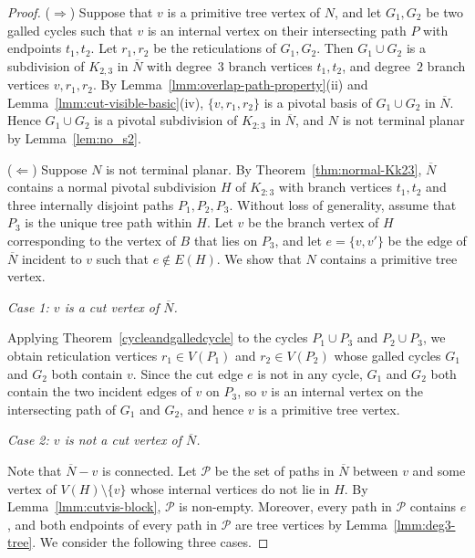 \documentclass[10pt,a4paper]{amsart}
\theoremstyle{plain}
\theoremstyle{thmstyleone}
\theoremstyle{thmstyletwo}
\theoremstyle{thmstylethree}
\begin{document}
\begin{proof}
($\Rightarrow$) Suppose that $v$ is a primitive tree vertex of ${N}$, and let $G_1, G_2$ be two galled cycles such that $v$ is an internal vertex on their intersecting path $P$ with endpoints $t_1, t_2$. Let $r_1, r_2$ be the reticulations of $G_1, G_2$. Then $G_1 \cup G_2$ is a subdivision of $K_{2,3}$ in $\overline{N}$ with degree~$3$ branch vertices $t_1, t_2$, and degree~$2$ branch vertices $v, r_1, r_2$. By Lemma~\ref{lmm:overlap-path-property}(ii) and Lemma~\ref{lmm:cut-visible-basic}(iv), $\{v,r_1,r_2\}$ is a pivotal basis of $G_1\cup G_2$ in $\overline{N}$. Hence $G_1\cup G_2$ is a pivotal subdivision of $K_{2:3}$ in $\overline{N}$, and $N$ is not terminal planar by Lemma~\ref{lem:no_s2}.
\smallskip

($\Leftarrow$) Suppose $N$ is not terminal planar. By Theorem~\ref{thm:normal-Kk23}, $\overline{N}$ contains a normal pivotal subdivision $H$ of $K_{2:3}$ with branch vertices $t_1, t_2$ and three internally disjoint paths $P_1, P_2, P_3$. Without loss of generality, assume that $P_3$ is the unique tree path within $H$. Let $v$ be the branch vertex of $H$ corresponding to the vertex of $B$ that lies on $P_3$, and let $e=\{v,v'\}$ be the edge of $\overline{N}$ incident to $v$ such that $e \notin E(H)$. We show that ${N}$ contains a primitive tree vertex.

\smallskip
\noindent\textit{Case 1: $v$ is a cut vertex of $\overline{N}$.}

Applying Theorem~\ref{cycleandgalledcycle} to the cycles $P_1\cup P_3$ and $P_2\cup P_3$, we obtain reticulation vertices $r_1\in V(P_1)$ and $r_2\in V(P_2)$ whose galled cycles $G_1$ and $G_2$ both contain $v$. Since the cut edge $e$ is not in any cycle, $G_1$ and $G_2$ both contain the two incident edges of $v$ on $P_3$, so $v$ is an internal vertex on the intersecting path of $G_1$ and $G_2$, and hence $v$ is a primitive tree vertex.

\smallskip
\noindent\textit{Case 2: $v$ is not a cut vertex of $\overline{N}$.}

Note that $\overline{N}-v$ is connected. Let $\mathcal{P}$ be the set of paths in $\overline{N}$ between $v$ and some vertex of $V(H)\setminus\{v\}$ whose internal vertices do not lie in $H$. By Lemma~\ref{lmm:cutvis-block}, $\mathcal{P}$ is non-empty. Moreover, every path in $\mathcal{P}$ contains $e$, and both endpoints of every path in $\mathcal{P}$ are tree vertices by Lemma~\ref{lmm:deg3-tree}. We consider the following three cases.


\end{proof}
\end{document}
